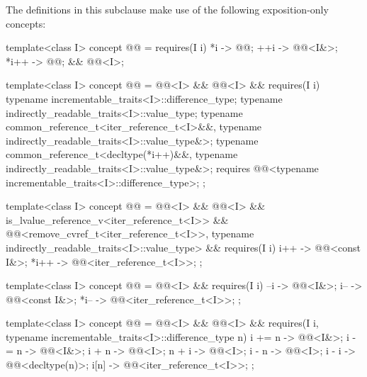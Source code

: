 \pnum
The definitions in this subclause make use of the following
exposition-only concepts:

\begin{codeblock}
template<class I>
concept @@ =
  requires(I i) {
    {   *i } -> @@;
    {  ++i } -> @@<I&>;
    { *i++ } -> @@;
  } && @@<I>;

template<class I>
concept @@ =
  @@<I> && @@<I> && requires(I i) {
    typename incrementable_traits<I>::difference_type;
    typename indirectly_readable_traits<I>::value_type;
    typename common_reference_t<iter_reference_t<I>&&,
                                typename indirectly_readable_traits<I>::value_type&>;
    typename common_reference_t<decltype(*i++)&&,
                                typename indirectly_readable_traits<I>::value_type&>;
    requires @@<typename incrementable_traits<I>::difference_type>;
  };

template<class I>
concept @@ =
  @@<I> && @@<I> &&
  is_lvalue_reference_v<iter_reference_t<I>> &&
  @@<remove_cvref_t<iter_reference_t<I>>,
          typename indirectly_readable_traits<I>::value_type> &&
  requires(I i) {
    {  i++ } -> @@<const I&>;
    { *i++ } -> @@<iter_reference_t<I>>;
  };

template<class I>
concept @@ =
  @@<I> && requires(I i) {
    {  --i } -> @@<I&>;
    {  i-- } -> @@<const I&>;
    { *i-- } -> @@<iter_reference_t<I>>;
  };

template<class I>
concept @@ =
  @@<I> && @@<I> &&
  requires(I i, typename incrementable_traits<I>::difference_type n) {
    { i += n } -> @@<I&>;
    { i -= n } -> @@<I&>;
    { i +  n } -> @@<I>;
    { n +  i } -> @@<I>;
    { i -  n } -> @@<I>;
    { i -  i } -> @@<decltype(n)>;
    {  i[n]  } -> @@<iter_reference_t<I>>;
  };
\end{codeblock}

